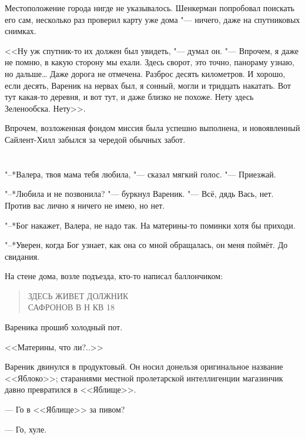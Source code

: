 Местоположение города нигде не указывалось.
Шенкерман попробовал поискать его сам, несколько раз проверил карту уже дома "--- ничего, даже на спутниковых снимках.

<<Ну уж спутник-то их должен был увидеть, "--- думал он.
"--- Впрочем, я даже не помню, в какую сторону мы ехали.
Здесь сворот, это точно, панораму узнаю, но дальше\ldots{}
Даже дорога не отмечена.
Разброс десять километров.
И хорошо, если десять, Вареник на нервах был, я сонный, могли и тридцать накатать.
Вот тут какая-то деревня, и вот тут, и даже близко не похоже.
Нету здесь Зеленообска.
Нету>>.

Впрочем, возложенная фондом миссия была успешно выполнена, и новоявленный Сайлент-Хилл забылся за чередой обычных забот.

\chapter{}

\textspace

"--*Валера, твоя мама тебя любила, "--- сказал мягкий голос.
"--- Приезжай.

"--*Любила и не позвонила? "--- буркнул Вареник.
"--- Всё, дядь Вась, нет.
Против вас лично я ничего не имею, но нет.

"--*Бог накажет, Валера, не надо так.
На материны-то поминки хотя бы приходи.

"--*Уверен, когда Бог узнает, как она со мной обращалась, он меня поймёт.
До свидания.

\textspace

\label{Mon_2012_06_04}

На стене дома, возле подъезда, кто-то написал баллончиком:

\begin{quote}
ЗДЕСЬ ЖИВЕТ ДОЛЖНИК\\
САФРОНОВ В Н КВ 18
\end{quote}

Вареника прошиб холодный пот.

<<Материны, что ли?..>>

\textspace

Вареник двинулся в продуктовый.
Он носил донельзя оригинальное название <<Яблоко>>;
стараниями местной пролетарской интеллигенции магазинчик давно превратился в <<Яблище>>.

--- Го в <<Яблище>> за пивом?

--- Го, хуле.


